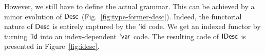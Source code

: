 However, we still have to define the actual grammar. This can be
achieved by a minor evolution of $\Desc$
(Fig.~\ref{fig:type-former-desc}). Indeed, the functorial nature of
$\Desc$ is entirely captured by the $\DId$ code. We get an indexed
functor by turning $\DId$ into an index-dependent $\DVar{\!}$
code. The resulting code of $\IDesc{\!}$ is presented in
Figure~\ref{fig:idesc}.


